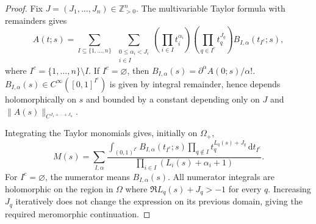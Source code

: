 \documentclass[a4paper,12pt]{amsart}
\numberwithin{equation}{section}
\theoremstyle{definition}
\theoremstyle{remark}
\newcommand{\dd}{\mathrm d}
\begin{document}
\begin{proof}
Fix $J=(J_1,\ldots,J_n)\in\mathbb Z_{>0}^n$. The multivariable Taylor formula with remainders gives
\[
 A(t;s)=\sum_{I\subseteq\{1,\ldots,n\}}\;
 \sum_{\substack{0\le\alpha_i<J_i\\ i\in I}}
 \left(\prod_{i\in I}t_i^{\alpha_i}\right)
 \left(\prod_{q\in I^c}t_q^{J_q}\right)
 B_{I,\alpha}(t_{I^c};s),
\]
where $I^c=\{1,\ldots,n\}\setminus I$. If $I^c=\varnothing$, then $B_{I,\alpha}(s)=\partial^\alpha A(0;s)/\alpha!$. $B_{I,\alpha}(s)\in C^\infty([0,1]^{I^c})$ is given by integral remainder, hence depends holomorphically on $s$ and bounded by a constant depending only on $J$ and $\|A(s)\|_{C^{J_1+\cdots+J_n}}$.

Integrating the Taylor monomials gives, initially on $\Omega_+$,
\[
 M(s)=\sum_{I,\alpha}
 \frac{\displaystyle\int_{(0,1)^{I^c}}
 B_{I,\alpha}(t_{I^c};s)
 \prod_{q\notin I}t_q^{L_q(s)+J_q}\,\dd t_{I^c}}
 {\displaystyle\prod_{i\in I}(L_i(s)+\alpha_i+1)}.
\]
For $I^c=\varnothing$, the numerator means $B_{I,\alpha}(s)$. All numerator integrals are holomorphic on the region in $\Omega$ where $\Re L_q(s)+J_q>-1$ for every $q$. Increasing $J_q$ iteratively does not change the expression on its previous domain, giving the required meromorphic continuation.
\end{proof}
\end{document}
